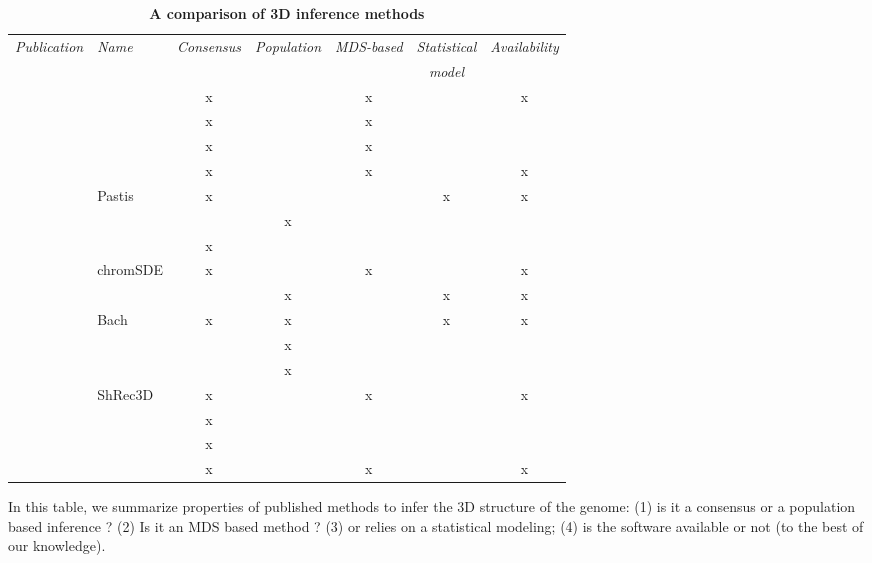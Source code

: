 \begin{table}[ht!]
\begin{center}
\small
\begin{tabular}{rlccccc}
\hline
\multirow{2}{*}{\emph{\footnotesize Publication}} & \multirow{2}{*}{\emph{\footnotesize Name}} &
\multirow{2}{*}{\emph{\footnotesize Consensus}} & \multirow{2}{*}{\emph{\footnotesize Population}}
&\multirow{2}{*}{\emph{\footnotesize MDS-based}} & \emph{\footnotesize Statistical} &
\multirow{2}{*}{\emph{\footnotesize Availability}} \\
& & & & & \emph{\footnotesize model} & \\
\hline
\footnotesize{\citet{duan:three}} &  & x & & x & & x \\
\footnotesize{\citet{tanizawa:mapping}} & & x & & x & & \\
\footnotesize{\citet{ay:three-dimensional}} & & x & & x & & \\
\footnotesize{\citet{ben-elazar:spatial}} & & x & & x & & x \\
\footnotesize{\citet{varoquaux:statistical}} & Pastis & x & & & x & x\\
\footnotesize{\citet{bau:three-dimensional}} & & & x & & & \\
\footnotesize{\citet{umbarger:three-dimensional}} & & x & & & &\\
\footnotesize{\citet{zhang:inference}} & chromSDE & x & & x & & x\\
\footnotesize{\citet{rousseau:three}} & & & x & & x & x\\
\footnotesize{\citet{hu:bayesian}} & Bach & x & x & & x & x\\
\footnotesize{\citet{kalhor:genome}} & & & x & & &\\
\footnotesize{\citet{wong:predictive}} & & & x & & & \\
\footnotesize{\citet{lesne:3d}} & ShRec3D & x & & x & & x \\
\footnotesize{\citet{trieu:large}} & & x & & & & \\
\footnotesize{\citet{nagano:single-cell}} & & x & & & & \\
\footnotesize{\citet{paulsen:manifold}} & & x & & x & & x \\
\end{tabular}
\end{center}
\caption{\bf A comparison of 3D inference methods}{In this table, we summarize
properties of published methods to infer the 3D structure of the genome: (1)
is it a consensus or a population based inference ? (2) Is it an MDS based
method ? (3) or relies on a statistical modeling; (4) is the software
available or not (to the best of our knowledge).}
\end{table}


